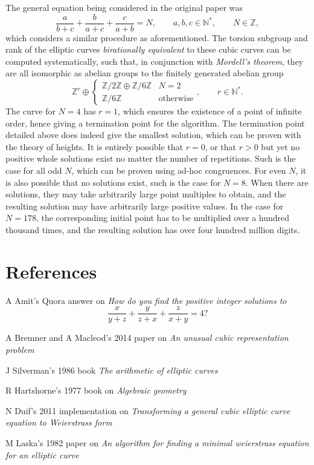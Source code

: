 \documentclass{article}
\newcommand{\N}{\mathbb{N}}
\newcommand{\Z}{\mathbb{Z}}
\begin{document}
The general equation being considered in the original paper was
$$ \dfrac{a}{b + c} + \dfrac{b}{a + c} + \dfrac{c}{a + b} = N, \qquad a, b, c \in \N^*, \qquad N \in \Z, $$
which considers a similar procedure as aforementioned. The torsion subgroup and rank of the elliptic curves \emph{birationally equivalent} to these cubic curves can be computed systematically, such that, in conjunction with \emph{Mordell's theorem}, they are all isomorphic as abelian groups to the finitely generated abelian group
$$ \Z^r \oplus
\begin{cases}
\Z / 2\Z \oplus \Z / 6\Z & N = 2 \\
\Z / 6\Z & \text{otherwise}
\end{cases},
\qquad
r \in \N^*.
$$
The curve for $ N = 4 $ has $ r = 1 $, which ensures the existence of a point of infinite order, hence giving a termination point for the algorithm. The termination point detailed above does indeed give the smallest solution, which can be proven with the theory of heights. It is entirely possible that $ r = 0 $, or that $ r > 0 $ but yet no positive whole solutions exist no matter the number of repetitions. Such is the case for all odd $ N $, which can be proven using ad-hoc congruences. For even $ N $, it is also possible that no solutions exist, such is the case for $ N = 8 $. When there are solutions, they may take arbitrarily large point multiples to obtain, and the resulting solution may have arbitrarily large positive values. In the case for $ N = 178 $, the corresponding initial point has to be multiplied over a hundred thousand times, and the resulting solution has over four hundred million digits.

\section{References}

\begin{enumerate}[label={[\arabic*]}]
\item A Amit's Quora answer on \emph{How do you find the positive integer solutions to} \label{quora}
$$ \dfrac{x}{y + z} + \dfrac{y}{z + x} + \dfrac{z}{x + y} = 4? $$
\item A Bremner and A Macleod's 2014 paper on \emph{An unusual cubic representation problem} \label{aucrp}
\item J Silverman's 1986 book \emph{The arithmetic of elliptic curves} \label{aec}
\item R Hartshorne's 1977 book on \emph{Algebraic geometry} \label{ag}
\item N Duif's 2011 implementation on \emph{Transforming a general cubic elliptic curve equation to Weierstrass form} \label{weierstrass}
\item M Laska's 1982 paper on \emph{An algorithm for finding a minimal weierstrass equation for an elliptic curve} \label{laska}
\end{enumerate}
\end{document}
